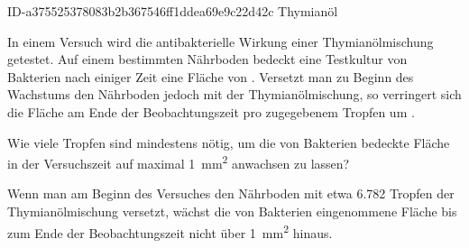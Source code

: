 \begin{exercise}
      {ID-a375525378083b2b367546ff1ddea69e9c22d42c}
      {Thymianöl}
  \ifproblem\problem\par
    In einem Versuch wird die antibakterielle Wirkung einer
    Thymianölmischung getestet. Auf einem bestimmten Nährboden
    bedeckt eine Testkultur von Bakterien nach einiger Zeit
    eine Fläche von . Versetzt man zu Beginn des Wachstums
    den Nährboden jedoch mit der Thymianölmischung, so verringert
    sich die Fläche am Ende der Beobachtungszeit pro zugegebenem
    Tropfen um .\par
    Wie viele Tropfen sind mindestens nötig, um die von Bakterien
    bedeckte Fläche in der Versuchszeit auf maximal
    \SI{1}{\square\milli\metre} anwachsen zu lassen?
  \fi
  \ifoutcome\outcome\par
    Wenn man am Beginn des Versuches den Nährboden mit etwa
    \num{6.782} Tropfen der Thymianölmischung versetzt, wächst
    die von Bakterien eingenommene Fläche bis zum Ende der
    Beobachtungszeit nicht über \SI{1}{\square\milli\metre} hinaus.
  \fi
\end{exercise}
